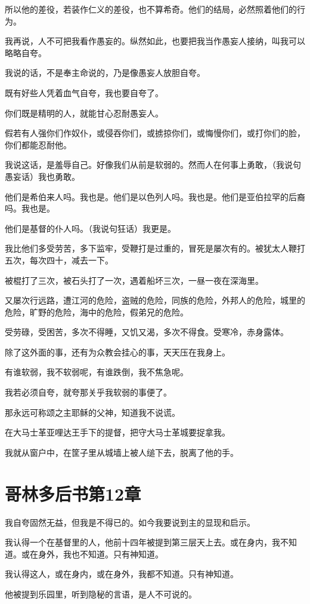 \documentclass[12pt,oneside]{book}
\begin{document}
所以他的差役，若装作仁义的差役，也不算希奇。他们的结局，必然照着他们的行为。

我再说，人不可把我看作愚妄的。纵然如此，也要把我当作愚妄人接纳，叫我可以略略自夸。

我说的话，不是奉主命说的，乃是像愚妄人放胆自夸。

既有好些人凭着血气自夸，我也要自夸了。

你们既是精明的人，就能甘心忍耐愚妄人。

假若有人强你们作奴仆，或侵吞你们，或掳掠你们，或悔慢你们，或打你们的脸，你们都能忍耐他。

我说这话，是羞辱自己。好像我们从前是软弱的。然而人在何事上勇敢，（我说句愚妄话）我也勇敢。

他们是希伯来人吗。我也是。他们是以色列人吗。我也是。他们是亚伯拉罕的后裔吗。我也是。

他们是基督的仆人吗。（我说句狂话）我更是。

我比他们多受劳苦，多下监牢，受鞭打是过重的，冒死是屡次有的。被犹太人鞭打五次，每次四十，减去一下。

被棍打了三次，被石头打了一次，遇着船坏三次，一昼一夜在深海里。

又屡次行远路，遭江河的危险，盗贼的危险，同族的危险，外邦人的危险，城里的危险，旷野的危险，海中的危险，假弟兄的危险。

受劳碌，受困苦，多次不得睡，又饥又渴，多次不得食。受寒冷，赤身露体。

除了这外面的事，还有为众教会挂心的事，天天压在我身上。

有谁软弱，我不软弱呢，有谁跌倒，我不焦急呢。

我若必须自夸，就夸那关乎我软弱的事便了。

那永远可称颂之主耶稣的父神，知道我不说谎。

在大马士革亚哩达王手下的提督，把守大马士革城要捉拿我。

我就从窗户中，在筐子里从城墙上被人缒下去，脱离了他的手。

\chapter{哥林多后书第12章}
我自夸固然无益，但我是不得已的。如今我要说到主的显现和启示。

我认得一个在基督里的人，他前十四年被提到第三层天上去。或在身内，我不知道。或在身外，我也不知道。只有神知道。

我认得这人，或在身内，或在身外，我都不知道。只有神知道。

他被提到乐园里，听到隐秘的言语，是人不可说的。
\end{document}
